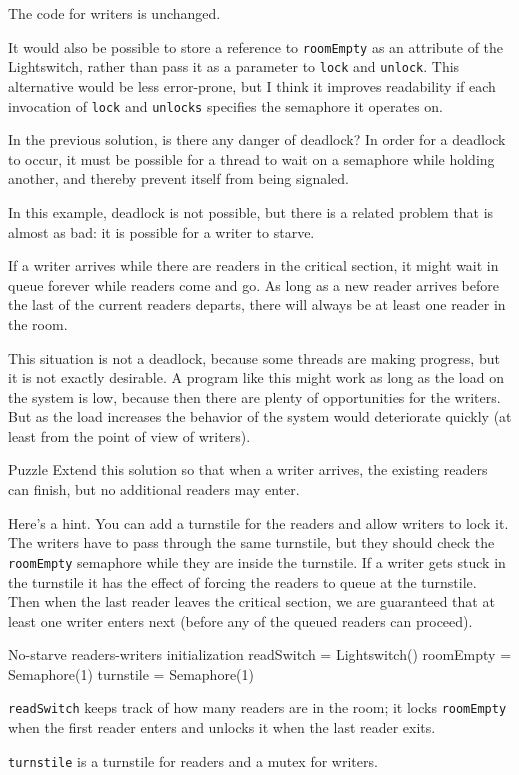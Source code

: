 The code for writers is unchanged.

It would also be possible to store a reference to {\tt roomEmpty}
as an attribute of the Lightswitch, rather than pass it as a parameter
to {\tt lock} and {\tt unlock}.  This alternative would be less
error-prone, but I think it improves readability if each invocation
of {\tt lock} and {\tt unlocks} specifies the semaphore it operates on.


In the previous solution, is there any danger of deadlock?
In order for a deadlock to occur, it must be possible for a
thread to wait on a semaphore while holding another, and thereby
prevent itself from being signaled.

In this example, deadlock is not possible, but there is a related
problem that is almost as bad: it is possible for a writer to
starve.

If a writer arrives while there are readers in the critical section,
it might wait in queue forever while readers come and go.  As long
as a new reader arrives before the last of the current readers
departs, there will always be at least one reader in the room.

This situation is not a deadlock, because some threads are making
progress, but it is not exactly desirable.  A program like this
might work as long as the load on the system is low, because then there
are plenty of opportunities for the writers.  But as the load
increases the behavior of the system would deteriorate quickly
(at least from the point of view of writers).

\begin{puzzlebox}{Puzzle}
Extend this solution so that when a writer arrives,
the existing readers can finish, but no additional readers
may enter.



Here's a hint.  You can add a turnstile for the readers and
allow writers to lock it.  The writers have to pass through
the same turnstile, but they should check the {\tt roomEmpty}
semaphore while they are inside the turnstile.  If a writer
gets stuck in the turnstile it has the effect of forcing the
readers to queue at the turnstile.  Then when the last reader
leaves the critical section, we are guaranteed that at least
one writer enters next (before any of the queued readers can
proceed).

\begin{lstbox}{No-starve readers-writers initialization}
readSwitch = Lightswitch()
roomEmpty = Semaphore(1)
turnstile = Semaphore(1)
\end{lstbox}

{\tt readSwitch} keeps track of how many readers are in the room;
it locks {\tt roomEmpty} when the first reader
enters and unlocks it when the last reader exits.

{\tt turnstile} is a turnstile for readers and a 
mutex for writers.
\end{puzzlebox}


